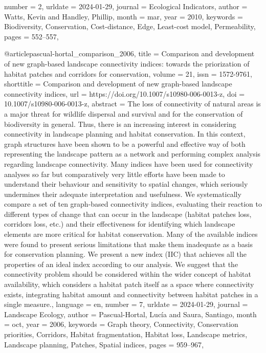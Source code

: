 {{{{	number = {2},
	urldate = {2024-01-29},
	journal = {Ecological Indicators},
	author = {Watts, Kevin and Handley, Phillip},
	month = mar,
	year = {2010},
	keywords = {Biodiversity, Conservation, Cost-distance, Edge, Least-cost model, Permeability},
	pages = {552--557},
}

@article{pascual-hortal_comparison_2006,
	title = {Comparison and development of new graph-based landscape connectivity indices: towards the priorization of habitat patches and corridors for conservation},
	volume = {21},
	issn = {1572-9761},
	shorttitle = {Comparison and development of new graph-based landscape connectivity indices},
	url = {https://doi.org/10.1007/s10980-006-0013-z},
	doi = {10.1007/s10980-006-0013-z},
	abstract = {The loss of connectivity of natural areas is a major threat for wildlife dispersal and survival and for the conservation of biodiversity in general. Thus, there is an increasing interest in considering connectivity in landscape planning and habitat conservation. In this context, graph structures have been shown to be a powerful and effective way of both representing the landscape pattern as a network and performing complex analysis regarding landscape connectivity. Many indices have been used for connectivity analyses so far but comparatively very little efforts have been made to understand their behaviour and sensitivity to spatial changes, which seriously undermines their adequate interpretation and usefulness. We systematically compare a set of ten graph-based connectivity indices, evaluating their reaction to different types of change that can occur in the landscape (habitat patches loss, corridors loss, etc.) and their effectiveness for identifying which landscape elements are more critical for habitat conservation. Many of the available indices were found to present serious limitations that make them inadequate as a basis for conservation planning. We present a new index (IIC) that achieves all the properties of an ideal index according to our analysis. We suggest that the connectivity problem should be considered within the wider concept of habitat availability, which considers a habitat patch itself as a space where connectivity exists, integrating habitat amount and connectivity between habitat patches in a single measure.},
	language = {en},
	number = {7},
	urldate = {2024-01-29},
	journal = {Landscape Ecology},
	author = {Pascual-Hortal, Lucía and Saura, Santiago},
	month = oct,
	year = {2006},
	keywords = {Graph theory, Connectivity, Conservation priorities, Corridors, Habitat fragmentation, Habitat loss, Landscape metrics, Landscape planning, Patches, Spatial indices},
	pages = {959--967},
}

}}}
